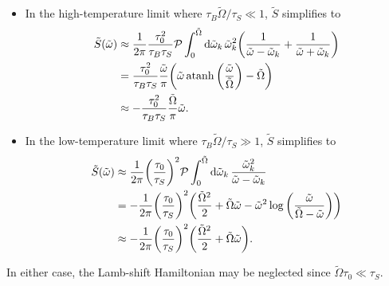 \documentclass[../thesis.tex]{subfiles}
\begin{document}
\begin{itemize}
  \item In the high-temperature limit where $\tau_B\tilde{\Omega} / \tau_S \ll
    1$, $\tilde{S}$ simplifies to
    \begin{align}
      \tilde{S}(\tilde{\omega})
      &\approx \frac{1}{2\pi} \frac{\tau_0^2}{\tau_B\tau_S}
      \pv\int_0^{\tilde{\Omega}} \dd{\tilde{\omega}_k} \tilde{\omega}_k^2
      \qty(\frac{1}{\tilde{\omega} - \tilde{\omega}_k}
      + \frac{1}{\tilde{\omega} + \tilde{\omega}_k}) \\
      &= \frac{\tau_0^2}{\tau_B\tau_S} \frac{\tilde{\omega}}{\pi}
      \qty(\tilde{\omega}\atanh\qty(\frac{\tilde{\omega}}{\tilde{\Omega}})
      - \tilde{\Omega}) \\
      &\approx -\frac{\tau_0^2}{\tau_B\tau_S}
      \frac{\tilde{\Omega}}{\pi}\tilde{\omega}.
    \end{align}

  \item In the low-temperature limit where $\tau_B\tilde{\Omega} / \tau_S \gg
    1$, $\tilde{S}$ simplifies to
    \begin{align}
      \tilde{S}(\tilde{\omega})
      &\approx \frac{1}{2\pi} {\qty(\frac{\tau_0}{\tau_S})}^2
      \pv\int_0^{\tilde{\Omega}} \dd{\tilde{\omega}_k}
      \frac{\tilde{\omega}_k^2}{\tilde{\omega} - \tilde{\omega}_k} \\
      &= -\frac{1}{2\pi} {\qty(\frac{\tau_0}{\tau_S})}^2 \qty(%
      \frac{\tilde{\Omega}^2}{2} + \tilde{\Omega}\tilde{\omega} -
      \tilde{\omega}^2
      \log\qty(\frac{\tilde{\omega}}{\tilde{\Omega} - \tilde{\omega}})
      ) \\
      &\approx -\frac{1}{2\pi} {\qty(\frac{\tau_0}{\tau_S})}^2 \qty(%
      \frac{\tilde{\Omega}^2}{2} + \tilde{\Omega}\tilde{\omega}
      ).
    \end{align}
\end{itemize}
In either case, the Lamb-shift Hamiltonian may be neglected since
$\tilde{\Omega} \tau_0 \ll \tau_S$.
\end{document}
